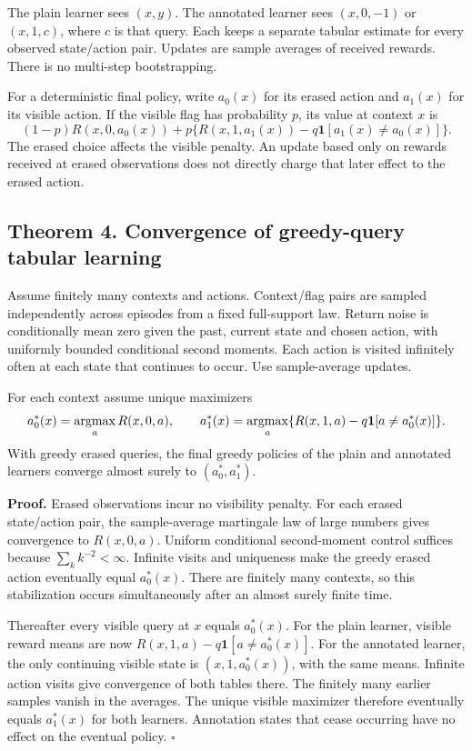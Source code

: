 \documentclass[
  11pt,
  letterpaper,
]{article}
\begin{document}
The plain learner sees \((x,y)\). The annotated learner sees
\((x,0,-1)\) or \((x,1,c)\), where \(c\) is that query. Each keeps a
separate tabular estimate for every observed state/action pair. Updates
are sample averages of received rewards. There is no multi-step
bootstrapping.

For a deterministic final policy, write \(a_0(x)\) for its erased action
and \(a_1(x)\) for its visible action. If the visible flag has
probability \(p\), its value at context \(x\) is \[
 (1-p)R(x,0,a_0(x))
   +p\{R(x,1,a_1(x))-q\mathbf1[a_1(x)\ne a_0(x)]\}.
\] The erased choice affects the visible penalty. An update based only
on rewards received at erased observations does not directly charge that
later effect to the erased action.

\subsection{Theorem 4. Convergence of greedy-query tabular
learning}\label{theorem-4.-convergence-of-greedy-query-tabular-learning}

Assume finitely many contexts and actions. Context/flag pairs are
sampled independently across episodes from a fixed full-support law.
Return noise is conditionally mean zero given the past, current state
and chosen action, with uniformly bounded conditional second moments.
Each action is visited infinitely often at each state that continues to
occur. Use sample-average updates.

For each context assume unique maximizers \[
 a_0^*(x)=\mathop{\rm argmax}_a R(x,0,a),\qquad
 a_1^*(x)=\mathop{\rm argmax}_a
       \{R(x,1,a)-q\mathbf1[a\ne a_0^*(x)]\}.
\] With greedy erased queries, the final greedy policies of the plain
and annotated learners converge almost surely to \((a_0^*,a_1^*)\).

\textbf{Proof.} Erased observations incur no visibility penalty. For
each erased state/action pair, the sample-average martingale law of
large numbers gives convergence to \(R(x,0,a)\). Uniform conditional
second-moment control suffices because \(\sum_k k^{-2}<\infty\).
Infinite visits and uniqueness make the greedy erased action eventually
equal \(a_0^*(x)\). There are finitely many contexts, so this
stabilization occurs simultaneously after an almost surely finite time.

Thereafter every visible query at \(x\) equals \(a_0^*(x)\). For the
plain learner, visible reward means are now
\(R(x,1,a)-q\mathbf1[a\ne a_0^*(x)]\). For the annotated learner, the
only continuing visible state is \((x,1,a_0^*(x))\), with the same
means. Infinite action visits give convergence of both tables there. The
finitely many earlier samples vanish in the averages. The unique visible
maximizer therefore eventually equals \(a_1^*(x)\) for both learners.
Annotation states that cease occurring have no effect on the eventual
policy. \hfill\(\square\)
\end{document}
